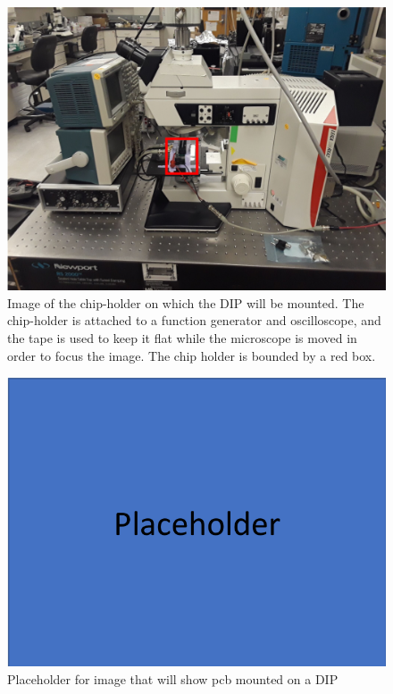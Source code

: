 \begin{figure}[htpb]
    \begin{center}
    \includegraphics[width=0.8\linewidth]{Chapter2/Figs/Raster/pcb_no_dip.png}
    \caption{Image of the chip-holder on which the DIP will be mounted. The chip-holder is attached to a function generator and oscilloscope, and the tape is used to keep it flat while the microscope is moved in order to focus the image. The chip holder is bounded by a red box.}\label{empty_mount}
    \end{center}
\end{figure}

\begin{figure}[htpb]
    \begin{center}
    \includegraphics[width=0.5\linewidth]{Chapter2/Figs/Raster/placeholder.png}
    \caption{Placeholder for image that will show pcb mounted on a DIP}\label{pcb}
    \end{center}
\end{figure}

